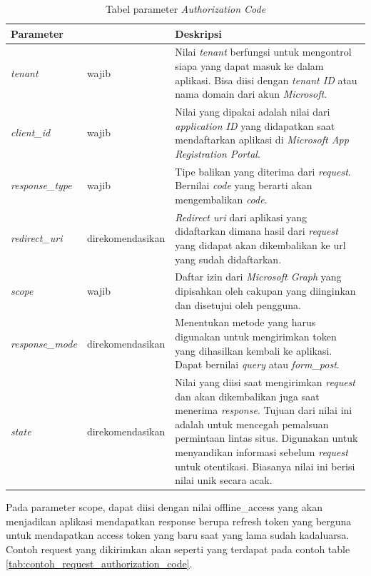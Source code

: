 \begin{table}[H]
	\centering 
	\caption{Tabel parameter \textit{Authorization Code}}
	\label{tab:parameter_authorization_code}
	\begin{tabular}{|p{3cm}|p{3cm}|p{9cm}|}
	\toprule
	\textbf{Parameter} & & \textbf{Deskripsi}\\ \hline 
	\textit{tenant} & wajib & Nilai \textit{tenant} berfungsi untuk mengontrol siapa yang dapat masuk ke dalam aplikasi. Bisa diisi dengan \textit{tenant ID} atau nama domain dari akun \textit{Microsoft}.\\ \hline 
	\textit{client\_id} & wajib & Nilai yang dipakai adalah nilai dari \textit{application ID} yang didapatkan saat mendaftarkan aplikasi di \textit{Microsoft App Registration Portal}.\\ \hline 
	\textit{response\_type} & wajib & Tipe balikan yang diterima dari \textit{request}. Bernilai 				\textit{code} yang berarti akan mengembalikan \textit{code}. \\ \hline 
	\textit{redirect\_uri} & direkomendasikan & \textit{Redirect uri} dari aplikasi yang didaftarkan dimana hasil dari \textit{request} yang didapat akan dikembalikan ke url yang sudah didaftarkan. \\ \hline 
	\textit{scope} & wajib & Daftar izin dari \textit{Microsoft Graph} yang dipisahkan oleh cakupan yang diinginkan dan disetujui oleh pengguna. \\ \hline 
\textit{response\_mode} & direkomendasikan & Menentukan metode yang harus digunakan untuk mengirimkan token yang dihasilkan kembali ke aplikasi. Dapat bernilai \textit{query} atau \textit{form\_post}. \\ \hline 
	\textit{state} & direkomendasikan & Nilai yang diisi saat mengirimkan \textit{request} dan akan dikembalikan juga saat menerima \textit{response}. Tujuan dari nilai ini adalah untuk mencegah pemalsuan permintaan lintas situs. Digunakan untuk menyandikan informasi sebelum \textit{request} untuk otentikasi. Biasanya nilai ini berisi nilai unik secara acak. \\ \bottomrule
\end{tabular}  
\end{table}

Pada parameter scope, dapat diisi dengan nilai offline\_access yang akan menjadikan aplikasi mendapatkan response berupa refresh token yang berguna untuk mendapatkan access token yang baru saat yang lama sudah kadaluarsa. Contoh request yang dikirimkan akan seperti yang terdapat pada contoh table \ref{tab:contoh_request_authorization_code}.


